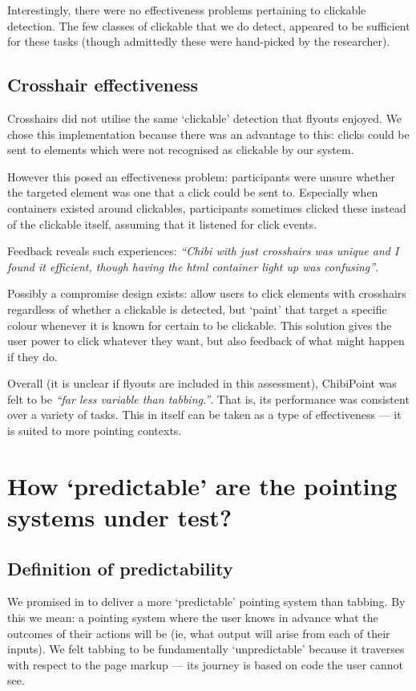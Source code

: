 \documentclass[11pt,openright,a4paper]{report}
\begin{document}
Interestingly, there were no effectiveness problems pertaining to clickable detection. The few classes of clickable that we do detect, appeared to be sufficient for these tasks (though admittedly these were hand-picked by the researcher).

\subsection{Crosshair effectiveness}
\label{sec:crosshair_effectiveness}
Crosshairs did not utilise the same `clickable' detection that flyouts enjoyed. We chose this implementation because there was an advantage to this: clicks could be sent to elements which were not recognised as clickable by our system.

However this posed an effectiveness problem: participants were unsure whether the targeted element was one that a click could be sent to. Especially when containers existed around clickables, participants sometimes clicked these instead of the clickable itself, assuming that it listened for click events.

Feedback reveals such experiences: \textit{``Chibi with just crosshairs was unique and I found it efficient, though having the html container light up was confusing''}.

Possibly a compromise design exists: allow users to click elements with crosshairs regardless of whether a clickable is detected, but `paint' that target a specific colour whenever it is known for certain to be clickable. This solution gives the user power to click whatever they want, but also feedback of what might happen if they do.

Overall (it is unclear if flyouts are included in this assessment), ChibiPoint was felt to be \textit{``far less variable than tabbing.''}. That is, its performance was consistent over a variety of tasks. This in itself can be taken as a type of effectiveness --- it is suited to more pointing contexts.

\section{How `predictable' are the pointing systems under test?}
\subsection{Definition of predictability}
We promised in  to deliver a more `predictable' pointing system than tabbing. By this we mean: a pointing system where the user knows in advance what the outcomes of their actions will be (ie, what output will arise from each of their inputs). We felt tabbing to be fundamentally `unpredictable' because it traverses with respect to the page markup --- its journey is based on code the user cannot see. 
\end{document}
